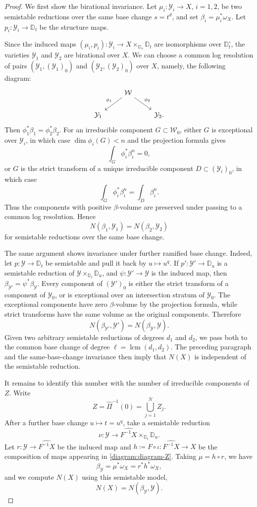 \documentclass[10pt,a4paper]{amsart}
\newcommand{\D}{{\mathbb D}}
\newcommand\cW{{\mathcal W}}
\newcommand{\cY}{\mathcal{Y}}
\begin{document}
\begin{proof}
We first show the birational invariance. Let
\(\mu_i\colon \cY_i\to X\), \(i=1,2\), be two
semistable reductions over the same base change \(s=t^d\), and set
\(\beta_i=\mu_i^*\omega_X\). Let \(p_i\colon \cY_i\to\D_t\) be the structure maps.

Since the induced maps \((\mu_i,p_i)\colon \cY_i\to X\times_{\D_s}\D_t\)
are isomorphisms over \(\D_t^\circ\), the varieties \(\cY_1\) and
\(\cY_2\) are birational over \(X\).
We can
choose a common log resolution of pairs $(\cY_1, (\cY_1)_0)$ and $(\cY_2,(\cY_2)_0)$ over \(X\), namely, the following diagram:
\[
\begin{tikzcd}
& \cW \arrow[dl, "\phi_1"'] \arrow[dr, "\phi_2"] & \\
\cY_1 && \cY_2 .
\end{tikzcd}
\]
Then \(\phi_1^*\beta_1=\phi_2^*\beta_2\). For an irreducible component
\(G\subset \cW_0\), either \(G\) is exceptional over \(\cY_i\), in which
case \(\dim \phi_i(G)<n\) and the projection formula gives
\[
\int_G \phi_i^*\beta_i^n=0,
\]
or \(G\) is the strict transform of a unique irreducible component
\(D\subset (\cY_i)_0\), in which case
\[
\int_G \phi_i^*\beta_i^n=\int_D \beta_i^n .
\]
Thus the components with positive \(\beta\)-volume are preserved under
passing to a common log resolution. Hence
\[
N(\beta_1,\cY_1)=N(\beta_2,\cY_2)
\]
for semistable reductions over the same base change.

The same argument shows invariance under further ramified base change.
Indeed, let \(p\colon\cY\to\D_t\) be semistable and pull it back by
\(u\mapsto u^q\). If \(p'\colon\cY'\to\D_u\) is a semistable reduction
of \(\cY\times_{\D_t}\D_u\), and \(\psi\colon\cY'\to\cY\) is the induced map,
then \(\beta_{\cY'}=\psi^*\beta_\cY\). Every component of \((\cY')_0\) is
either the strict transform of a component of \(\cY_0\), or is exceptional
over an intersection stratum of \(\cY_0\). The exceptional components have
zero \(\beta\)-volume by the projection formula, while strict transforms
have the same volume as the original components. Therefore
\[
N(\beta_{\cY'},\cY')=N(\beta_\cY,\cY).
\]
Given two arbitrary semistable reductions of degrees \(d_1\) and \(d_2\),
we pass both to the common base change of degree
\(\ell=\operatorname{lcm}(d_1,d_2)\). The preceding paragraph and the
same-base-change invariance then imply that \(N(X)\) is independent of
the semistable reduction.

It remains to identify this number with the number of irreducible
components of \(Z\). Write
\[
Z=\widehat{\Pi}^{-1}(0)=\bigcup_{j=1}^N Z_j .
\]
After a further base change \(u\mapsto t=u^q\), take a semistable
reduction
\[
\nu\colon \cY\to \widehat{F^{-1}X}\times_{\D_t}\D_u .
\]
Let \(r\colon\cY\to\widehat{F^{-1}X}\) be the induced map and
\(h \coloneqq F \circ \iota \colon\widehat{F^{-1}X}\to X\) be the composition of maps appearing in \cref{diagram:diagram-Z}. Taking \(\mu=h\circ r\), we have
\[
\beta_\cY=\mu^*\omega_X=r^*h^*\omega_X,
\]
and we compute $N(X)$ using this semistable model,
\[
N(X)=N(\beta_\cY,\cY).
\]


\end{proof}
\end{document}
